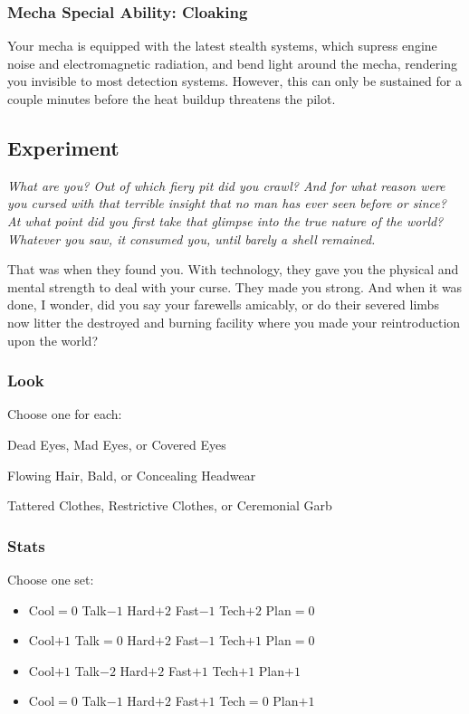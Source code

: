 \subsubsection{Mecha Special Ability: Cloaking}
Your mecha is equipped with the latest stealth systems, which supress engine noise and electromagnetic radiation, and bend light around the mecha, rendering you invisible to most detection systems. However, this can only be sustained for a couple minutes before the heat buildup threatens the pilot.



\subsection{Experiment}
{\itshape What \emph{are} you? Out of which fiery pit did you crawl?
  And for what reason were you cursed with that terrible insight that
  no man has ever seen before or since? At what point did you first
  take that glimpse into the true nature of the world?  Whatever you
  saw, it consumed you, until barely a shell remained.

That was when they found you. With technology, they gave you the
physical and mental strength to deal with your curse. They made you
strong. And when it was done, I wonder, did you say your farewells
amicably, or do their severed limbs now litter the destroyed and
burning facility where you made your reintroduction upon the world?}

\subsubsection{Look}
Choose one for each:

Dead Eyes, Mad Eyes, or Covered Eyes

Flowing Hair, Bald, or Concealing Headwear

Tattered Clothes, Restrictive Clothes, or Ceremonial Garb

\subsubsection{Stats}
Choose one set:
\begin{itemize}
\setlength\itemsep{0em}
\item Cool${=}0$ Talk$-1$ Hard$+2$ Fast$-1$ Tech$+2$ Plan${=}0$
\item Cool$+1$ Talk${=}0$ Hard$+2$ Fast$-1$ Tech$+1$ Plan${=}0$
\item Cool$+1$ Talk$-2$ Hard$+2$ Fast$+1$ Tech$+1$ Plan$+1$
\item Cool${=}0$ Talk$-1$ Hard$+2$ Fast$+1$ Tech${=}0$ Plan$+1$
\end{itemize}

